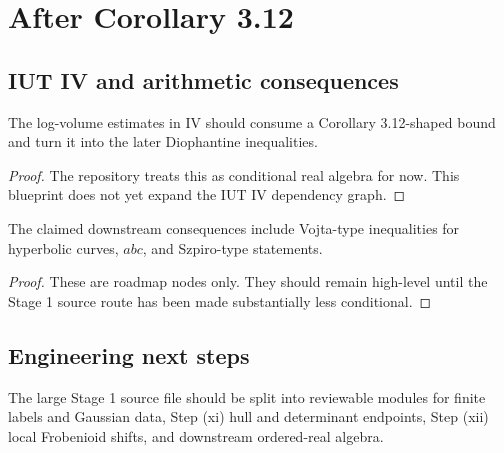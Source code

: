 \chapter{After Corollary 3.12}
\label{ch:after-corollary}

\section{IUT IV and arithmetic consequences}

\begin{theorem}
  \label{thm:iut-iv-consumes-corollary}
  \notready
  The log-volume estimates in \IUT{} IV should consume a Corollary
  3.12-shaped bound and turn it into the later Diophantine inequalities.
\end{theorem}

\begin{proof}
  The repository treats this as conditional real algebra for now.  This
  blueprint does not yet expand the IUT IV dependency graph.
\end{proof}

\begin{corollary}
  \label{cor:high-level-arithmetic-consequences}
  \notready
  The claimed downstream consequences include Vojta-type inequalities for
  hyperbolic curves, \(abc\), and Szpiro-type statements.
\end{corollary}

\begin{proof}
  These are roadmap nodes only.  They should remain high-level until the
  Stage 1 source route has been made substantially less conditional.
\end{proof}

\section{Engineering next steps}

\begin{proposition}
  \label{prop:refactor-source-module}
  \notready
  The large Stage 1 source file should be split into reviewable modules for
  finite labels and Gaussian data, Step (xi) hull and determinant endpoints,
  Step (xii) local Frobenioid shifts, and downstream ordered-real algebra.
\end{proposition}

